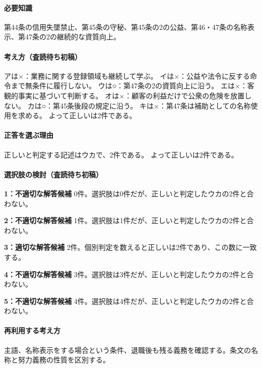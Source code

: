 \paragraph{必要知識} 第44条の信用失墜禁止、第45条の守秘、第45条の2の公益、第46・47条の名称表示、第47条の2の継続的な資質向上。

\paragraph{考え方（査読待ち初稿）} アは×：業務に関する登録領域も継続して学ぶ。 イは×：公益や法令に反する命令まで無条件に履行しない。 ウは○：第47条の2の資質向上に沿う。 エは×：客観的事実に基づいて判断する。 オは×：顧客の利益だけで公衆の危険を放置しない。 カは○：第45条後段の規定に沿う。 キは×：第47条は補助としての名称使用を求める。 よって正しいは2件である。

\paragraph{正答を選ぶ理由} 正しいと判定する記述はウカで、2件である。  よって正しいは2件である。

\paragraph{選択肢の検討（査読待ち初稿）}\mbox{}\par

\noindent\textbf{1：不適切な解答候補} 0件。選択肢は0件だが、正しいと判定したウカの2件と合わない。\par

\noindent\textbf{2：不適切な解答候補} 1件。選択肢は1件だが、正しいと判定したウカの2件と合わない。\par

\noindent\textbf{3：適切な解答候補} 2件。個別判定を数えると正しいは2件であり、この数に一致する。\par

\noindent\textbf{4：不適切な解答候補} 3件。選択肢は3件だが、正しいと判定したウカの2件と合わない。\par

\noindent\textbf{5：不適切な解答候補} 4件。選択肢は4件だが、正しいと判定したウカの2件と合わない。\par

\paragraph{再利用する考え方} 主語、名称表示をする場合という条件、退職後も残る義務を確認する。条文の名称と努力義務の性質を区別する。

